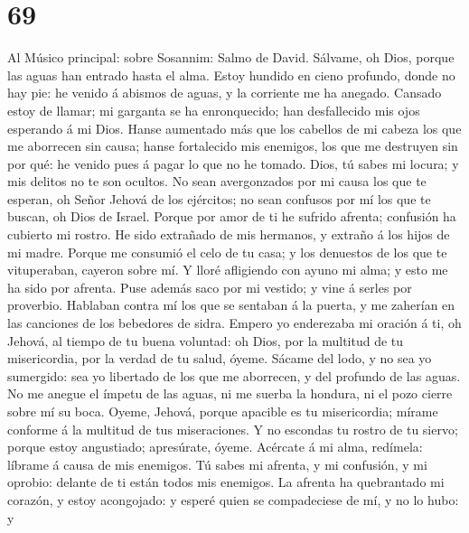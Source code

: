 \hypertarget{section-68}{%
\section{69}\label{section-68}}

 Al Músico principal: sobre Sosannim: Salmo de David.
Sálvame, oh Dios, porque las aguas han entrado hasta el alma.
 Estoy hundido en cieno profundo, donde no hay pie: he
venido á abismos de aguas, y la corriente me ha anegado. 
Cansado estoy de llamar; mi garganta se ha enronquecido; han
desfallecido mis ojos esperando á mi Dios.  Hanse
aumentado más que los cabellos de mi cabeza los que me aborrecen sin
causa; hanse fortalecido mis enemigos, los que me destruyen sin por qué:
he venido pues á pagar lo que no he tomado.  Dios, tú
sabes mi locura; y mis delitos no te son ocultos.  No sean
avergonzados por mi causa los que te esperan, oh Señor Jehová de los
ejércitos; no sean confusos por mí los que te buscan, oh Dios de Israel.
 Porque por amor de ti he sufrido afrenta; confusión ha
cubierto mi rostro.  He sido extrañado de mis hermanos, y
extraño á los hijos de mi madre.  Porque me consumió el
celo de tu casa; y los denuestos de los que te vituperaban, cayeron
sobre mí.  Y lloré afligiendo con ayuno mi alma; y esto
me ha sido por afrenta.  Puse además saco por mi vestido;
y vine á serles por proverbio.  Hablaban contra mí los
que se sentaban á la puerta, y me zaherían en las canciones de los
bebedores de sidra.  Empero yo enderezaba mi oración á
ti, oh Jehová, al tiempo de tu buena voluntad: oh Dios, por la multitud
de tu misericordia, por la verdad de tu salud, óyeme. 
Sácame del lodo, y no sea yo sumergido: sea yo libertado de los que me
aborrecen, y del profundo de las aguas.  No me anegue el
ímpetu de las aguas, ni me suerba la hondura, ni el pozo cierre sobre mí
su boca.  Oyeme, Jehová, porque apacible es tu
misericordia; mírame conforme á la multitud de tus miseraciones.
 Y no escondas tu rostro de tu siervo; porque estoy
angustiado; apresúrate, óyeme.  Acércate á mi alma,
redímela: líbrame á causa de mis enemigos.  Tú sabes mi
afrenta, y mi confusión, y mi oprobio: delante de ti están todos mis
enemigos.  La afrenta ha quebrantado mi corazón, y estoy
acongojado: y esperé quien se compadeciese de mí, y no lo hubo: y
